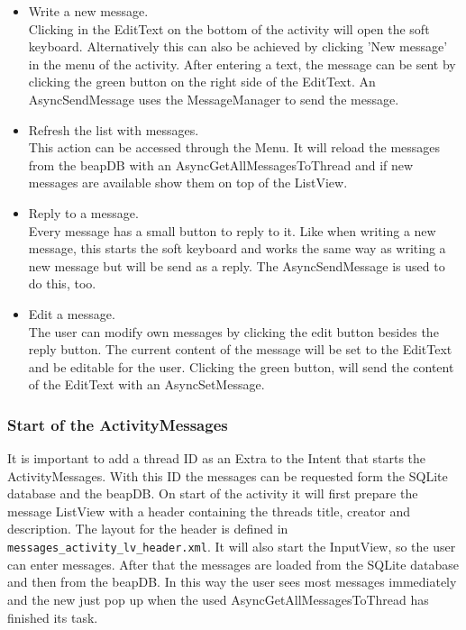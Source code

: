 \documentclass[12pt,a4paper,oneside]{report}
\newcommand{\beapDB}{beapDB}
\newcommand{\code}[1]{\lstinline{#1}}
\begin{document}
\begin{itemize}
\item Write a new message.\\
Clicking in the EditText on the bottom of the activity will open the soft keyboard. Alternatively this can also be achieved by clicking 'New message' in the menu of the activity. After entering a text, the message can be sent by clicking the green button on the right side of the EditText. An AsyncSendMessage uses the MessageManager to send the message.

\item Refresh the list with messages.\\
This action can be accessed through the Menu. It will reload the messages from the \beapDB{} with an AsyncGetAllMessagesToThread and if new messages are available show them on top of the ListView.

\item Reply to a message.\\
Every message has a small button to reply to it. Like when writing a new message, this starts the soft keyboard and works the same way as writing a new message but will be send as a reply. The AsyncSendMessage is used to do this, too.

\item Edit a message.\\
The user can modify own messages by clicking the edit button besides the reply button. The current content of the message will be set to the EditText and be editable for the user. Clicking the green button, will send the content of the EditText with an AsyncSetMessage.

\end{itemize}

\subsubsection{Start of the ActivityMessages}
It is important to add a thread ID as an Extra to the Intent that starts the ActivityMessages. With this ID the messages can be requested form the SQLite database and the \beapDB{}. On start of the activity it will first prepare the message ListView with a header containing the threads title, creator and description. The layout for the header is defined in \code{messages_activity_lv_header.xml}. It will also start the InputView, so the user can enter messages. After that the messages are loaded from the SQLite database and then from the \beapDB{}. In this way the user sees most messages immediately and the new just pop up when the used AsyncGetAllMessagesToThread has finished its task. 
\end{document}
